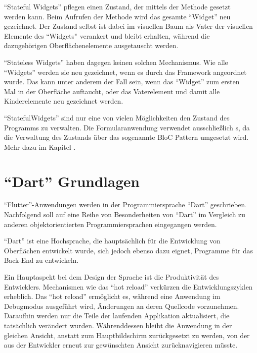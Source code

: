 \enquote{Stateful Widgets} pflegen einen Zustand, der mittels der Methode  gesetzt werden kann.
Beim Aufrufen der Methode wird das gesamte \enquote{Widget} neu gezeichnet.
Der Zustand selbst ist dabei im visuellen Baum als Vater der visuellen Elemente des \enquote{Widgets} verankert und bleibt erhalten, während die dazugehörigen Oberflächenelemente ausgetauscht werden.

\enquote{Stateless Widgets} haben dagegen keinen solchen Mechanismus.
Wie alle \enquote{Widgets} werden sie neu gezeichnet, wenn es durch das Framework angeordnet wurde.
Das kann unter anderem der Fall sein, wenn das \enquote{Widget} zum ersten Mal in der Oberfläche auftaucht, oder das Vaterelement und damit alle Kinderelemente neu gezeichnet werden.

\enquote{StatefulWidgets} sind nur eine von vielen Möglichkeiten den Zustand des Programms zu verwalten.
Die Formularanwendung verwendet ausschließlich s, da die Verwaltung des Zustands über das sogenannte BloC Pattern umgesetzt wird.
Mehr dazu im Kapitel .


\section{\enquote{Dart} Grundlagen}
\label{sec:Dart-Grundlagen}

\enquote{Flutter}-Anwendungen werden in der Programmiersprache \enquote{Dart} geschrieben.
Nachfolgend soll auf eine Reihe von Besonderheiten von \enquote{Dart} im Vergleich zu anderen objektorientierten Programmiersprachen eingegangen werden.

\enquote{Dart} ist eine Hochsprache, die hauptsächlich für die Entwicklung von Oberflächen entwickelt wurde, sich jedoch ebenso dazu eignet, Programme für das Back-End zu entwickeln.

Ein Hauptaspekt bei dem Design der Sprache ist die Produktivität des Entwicklers.
Mechanismen wie das \enquote{hot reload} verkürzen die Entwicklungszyklen erheblich.
Das \enquote{hot reload} ermöglicht es, während eine Anwendung im Debugmodus ausgeführt wird, Änderungen an deren Quellcode vorzunehmen.
Daraufhin werden nur die Teile der laufenden Applikation aktualisiert, die tatsächlich verändert wurden.
 Währenddessen bleibt die Anwendung in der gleichen Ansicht, anstatt zum Hauptbildschirm zurückgesetzt zu werden, von der aus der Entwickler erneut zur gewünschten Ansicht zurücknavigieren müsste.

